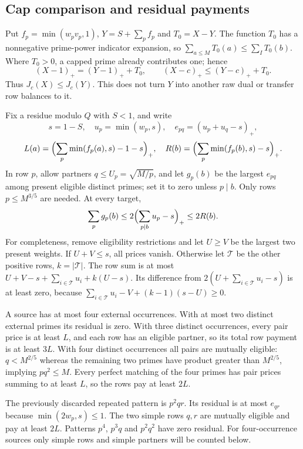 \documentclass[11pt,a4paper]{article}
\begin{document}
\subsection{Cap comparison and residual payments}
Put $f_p=\min(w_pv_p,1)$, $Y=S+\sum_pf_p$ and $T_0=X-Y$.
The function $T_0$ has a nonnegative prime-power indicator expansion,
so $\sum_{a\le M}T_0(a)\le\sum_IT_0(b)$. Where $T_0>0$, a capped
prime already contributes one; hence
\[
 (X-1)_+=(Y-1)_++T_0,
 \qquad (X-c)_+\le(Y-c)_++T_0.
\]
Thus $J_c(X)\le J_c(Y)$. This does not turn $Y$ into another raw
dual or transfer row balances to it.

Fix a residue modulo $Q$ with $S<1$, and write
\[
 s=1-S,\quad u_p=\min(w_p,s),\quad
 e_{pq}=(u_p+u_q-s)_+,
\]
\[
 L(a)=\Bigl(\sum_p\min(f_p(a),s)-1-s\Bigr)_+,
 \quad R(b)=\Bigl(\sum_p\min(f_p(b),s)-s\Bigr)_+.
\]
In row $p$, allow partners $q\le U_p=\sqrt{M/p}$, and let $g_p(b)$
be the largest $e_{pq}$ among present eligible distinct primes; set it
to zero unless $p\mid b$. Only rows $p\le M^{3/5}$ are needed.
At every target,
\begin{equation}
 \sum_pg_p(b)\le2\Bigl(\sum_{p\mid b}u_p-s\Bigr)_+\le2R(b).
                                                               \label{eq:rowbudget}
\end{equation}
For completeness, remove eligibility restrictions and let $U\ge V$
be the largest two present weights. If $U+V\le s$, all prices vanish.
Otherwise let $\mathcal T$ be the other positive rows, $k=|\mathcal T|$.
The row sum is at most
$U+V-s+\sum_{i\in\mathcal T}u_i+k(U-s)$.
Its difference from $2(U+\sum_{i\in\mathcal T}u_i-s)$ is at least zero,
because
$\sum_{i\in\mathcal T}u_i-V+(k-1)(s-U)\ge0$.

A source has at most four external occurrences. With at most two
distinct external primes its residual is zero. With three distinct
occurrences, every pair price is at least $L$, and each row has an
eligible partner, so its total row payment is at least $3L$.
With four distinct occurrences all pairs are mutually eligible:
$q<M^{2/5}$ whereas the remaining two primes have product greater
than $M^{2/5}$, implying $pq^2\le M$. Every perfect matching of the
four primes has pair prices summing to at least $L$, so the rows pay
at least $2L$.

The previously discarded repeated pattern is $p^2qr$. Its residual is
at most $e_{qr}$ because $\min(2w_p,s)\le1$. The two simple rows
$q,r$ are mutually eligible and pay at least $2L$. Patterns $p^4$,
$p^3q$ and $p^2q^2$ have zero residual. For four-occurrence sources
only simple rows and simple partners will be counted below.
\end{document}
